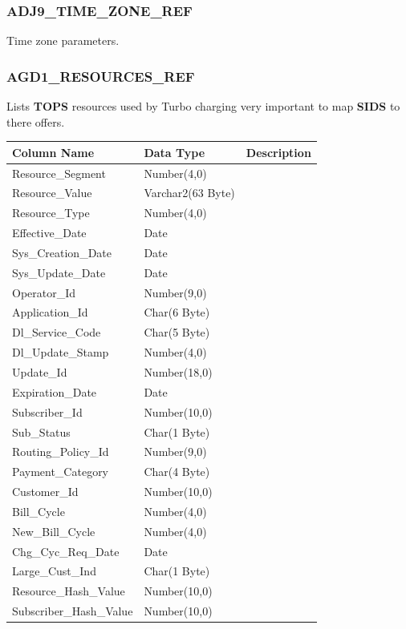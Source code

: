 \documentclass[12pt,twoside]{article}
\begin{document}
\normalsize

\subsubsection{ADJ9\_TIME\_ZONE\_REF}
\label{sec:orgheadline95}
Time zone parameters.

\subsubsection{AGD1\_RESOURCES\_REF}
\label{sec:orgheadline96}
Lists \textbf{TOPS} resources used by Turbo charging very important to map \textbf{SIDS} to there offers.
\footnotesize
\begin{center}
\begin{tabular}{lll}
\hline
\textbf{Column Name} & \textbf{Data Type} & \textbf{Description}\\
\hline
Resource\_Segment & Number(4,0) & \\
Resource\_Value & Varchar2(63 Byte) & \\
Resource\_Type & Number(4,0) & \\
Effective\_Date & Date & \\
Sys\_Creation\_Date & Date & \\
Sys\_Update\_Date & Date & \\
Operator\_Id & Number(9,0) & \\
Application\_Id & Char(6 Byte) & \\
Dl\_Service\_Code & Char(5 Byte) & \\
Dl\_Update\_Stamp & Number(4,0) & \\
Update\_Id & Number(18,0) & \\
Expiration\_Date & Date & \\
Subscriber\_Id & Number(10,0) & \\
Sub\_Status & Char(1 Byte) & \\
Routing\_Policy\_Id & Number(9,0) & \\
Payment\_Category & Char(4 Byte) & \\
Customer\_Id & Number(10,0) & \\
Bill\_Cycle & Number(4,0) & \\
New\_Bill\_Cycle & Number(4,0) & \\
Chg\_Cyc\_Req\_Date & Date & \\
Large\_Cust\_Ind & Char(1 Byte) & \\
Resource\_Hash\_Value & Number(10,0) & \\
Subscriber\_Hash\_Value & Number(10,0) & \\
\hline
\end{tabular}
\end{center}
\normalsize
\end{document}
